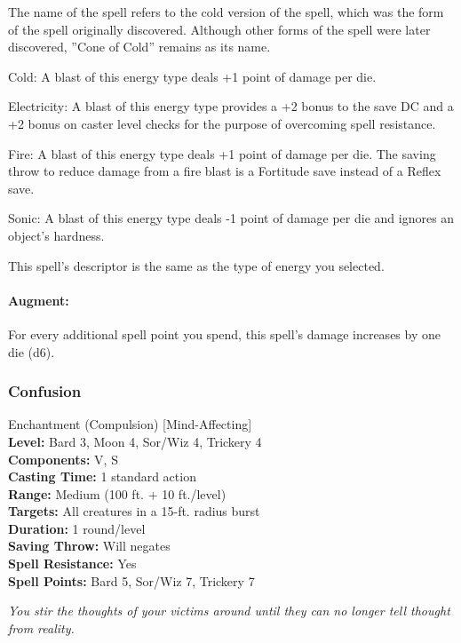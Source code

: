 The name of the spell refers to the cold version of the spell, which was the form of the spell originally discovered.
Although other forms of the spell were later discovered, ''Cone of Cold'' remains as its name.
\begin{list}{}{\leftmargin=1em}
 \item Cold: A blast of this energy type deals +1 point of damage per die. 
 \item Electricity: A blast of this energy type provides a +2 bonus to the save DC
 and a +2 bonus on caster level checks for the purpose of overcoming spell resistance.
 \item Fire: A blast of this energy type deals +1 point of damage per die.
 The saving throw to reduce damage from a fire blast is a Fortitude save instead of a Reflex save.
 \item Sonic: A blast of this energy type deals -1 point of damage per die and ignores an object's hardness.
\end{list}

This spell's descriptor is the same as the type of energy you selected. 

\paragraph{Augment:} For every additional spell point you spend, 
this spell's damage increases by one die (d6).
\subsubsection{Confusion}
\label{Spell:Confusion}
Enchantment (Compulsion) [Mind-Affecting]
\\ \textbf{Level:} Bard 3, Moon 4, Sor/Wiz 4, Trickery 4
\\ \textbf{Components:} V, S
\\ \textbf{Casting Time:} 1 standard action
\\ \textbf{Range:} Medium (100 ft. + 10 ft./level)
\\ \textbf{Targets:} All creatures in a 15-ft. radius burst
\\ \textbf{Duration:} 1 round/level
\\ \textbf{Saving Throw:} Will negates
\\ \textbf{Spell Resistance:} Yes
\\ \textbf{Spell Points:} Bard 5, Sor/Wiz 7, Trickery 7

\emph{You stir the thoughts of your victims around until they can no longer tell thought from reality.}

